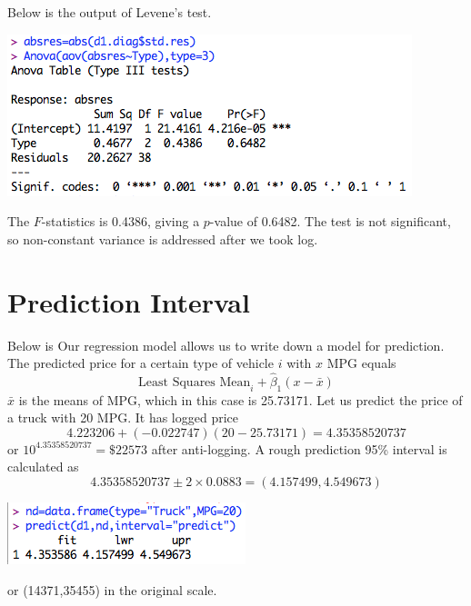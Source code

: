 \documentclass[a4 paper, 11 pt]{article}
\begin{document}
Below is the output of Levene's test.
\begin{center}
\includegraphics[scale=0.5]{diaglevene}
\end{center}
The $F$-statistics is 0.4386, giving a $p$-value of 0.6482. The test is not significant, so non-constant variance is addressed after we took log.
\section{Prediction Interval}
Below is
Our regression model allows us to write down a model for prediction. The predicted price for a certain type of vehicle $i$ with $x$ MPG equals
\[
\text{Least Squares Mean}_i + \hat \beta_1(x - \bar x)
\]
$\bar x$ is the means of MPG, which in this case is 25.73171. Let us predict the price of a truck with 20 MPG. It has logged price
\[
4.223206 + (-0.022747)(20-25.73171) = 4.35358520737
\]
or $10^4.35358520737 = \$22573$ after anti-logging. A rough prediction 95\% interval is calculated as
\[
4.35358520737 \pm 2 \times 0.0883 = (4.157499,4.549673)
\]
\begin{center}
\includegraphics[scale=0.6]{d1pred}
\end{center}
or (14371,35455) in the original scale.
\end{document}

